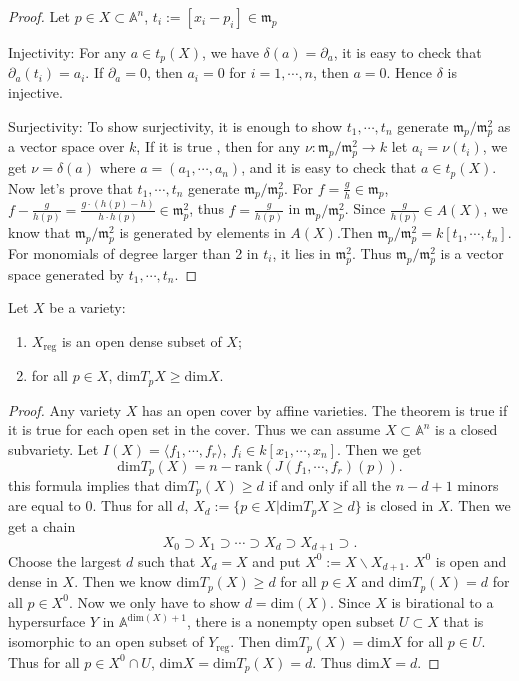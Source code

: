 \begin{proof}
	Let $ p\in X\subset\mathbb{A}^n $, $ t_i:=[x_i-p_i]\in \mathfrak{m}_p $

	Injectivity: For any $ a\in t_p(X) $, we have $ \delta (a)=\partial_a $, it is easy to check that $ \partial_a(t_i)=a_i $. If $ \partial_a=0 $, then $ a_i=0 $ for $ i=1,\cdots,n $, then $ a=0 $. Hence $ \delta $ is injective.

	Surjectivity: To show surjectivity, it is enough to show $ t_1,\cdots,t_n $ generate $ \mathfrak{m}_p/\mathfrak{m}_p^2 $ as a vector space over $ k $, If  it is true , then for any $ \nu:\mathfrak{m}_p/\mathfrak{m}_p^2\to k $ let $ a_i=\nu(t_i) $, we get $ \nu=\delta(a) $ where $ a=(a_1,\cdots,a_n) $, and it is easy to check that $ a\in t_p(X) $. Now let's prove that $ t_1,\cdots,t_n $ generate $ \mathfrak{m}_p/\mathfrak{m}_p^2 $. For $ f=\frac{g}{h}\in \mathfrak{m}_p $, $ f-\frac{g}{h(p)}=\frac{g\cdot(h(p)-h)}{h\cdot h(p)}\in \mathfrak{m}_p^2 $, thus $ f=\frac{g}{h(p)} $ in $ \mathfrak{m}_p/\mathfrak{m}_p^2 $. Since $ \frac{g}{h(p)}\in A(X) $, we know that $ \mathfrak{m}_p/\mathfrak{m}_p^2 $ is generated by elements in $ A(X) $.Then $ \mathfrak{m}_p/\mathfrak{m}_p^2 =k[t_1,\cdots,t_n]$. For monomials of degree larger than 2 in $ t_i $, it lies in $ \mathfrak{m}_p^2 $.  Thus $ \mathfrak{m}_p/\mathfrak{m}_p^2 $ is a vector space generated by $ t_1,\cdots,t_n $.
\end{proof}
\begin{theorem}
	Let $ X $ be a variety:
	\begin{enumerate}
		\item $ X_{\mathrm{reg}} $ is an open dense subset of $ X $;
		\item for all $ p\in X $, $ \mathrm{dim}T_pX\geq \mathrm{dim}X $.
	\end{enumerate}
\end{theorem}
\begin{proof}
	Any variety $ X $ has an open cover by affine varieties. The theorem is true if it is true for each open set in the cover. Thus we can assume $ X\subset\mathbb{A}^n $ is a closed subvariety. Let $ I(X)=\langle f_1,\cdots,f_r\rangle $, $ f_i\in k[x_1,\cdots,x_n] $. Then we get
	$$
		\mathrm{dim}T_p(X)= n- \mathrm{rank}(J(f_1,\cdots,f_r)(p)).
	$$
	this formula implies that $ \mathrm{dim}T_p(X)\geq d $ if and only if all the $ n-d+1 $ minors are equal to $ 0 $.
	Thus for all $ d $, $ X_d:=\lbrace p\in X|\mathrm{dim}T_pX\geq d\rbrace $ is closed in $ X $. Then we get a chain
	$$
		X_0\supset X_1\supset \cdots\supset X_d\supset X_{d+1}\supset.
	$$
	Choose the largest $ d $ such that $ X_d=X $ and put $ X^0:=X\backslash X_{d+1} $. $ X^0 $ is open and dense in $ X $. Then we know $ \mathrm{dim}T_p(X)\geq d $ for all $ p\in X $ and $ \mathrm{dim}T_p(X)=d $ for all $ p\in X^0 $. Now we only have to show $ d=\mathrm{dim}(X) $. Since $ X $ is birational to a hypersurface $ Y $ in $ \mathbb{A}^{\mathrm{dim}(X)+1} $, there is a nonempty open subset $ U\subset X $ that is isomorphic to an open subset of $ Y_{\mathrm{reg}} $. Then $ \mathrm{dim}T_p(X)=\mathrm{dim}X $ for all $ p\in U $. Thus for all $ p\in X^0\cap U $, $ \mathrm{dim}X=\mathrm{dim}T_p(X)=d $. Thus $ \mathrm{dim}X=d $.
\end{proof}
